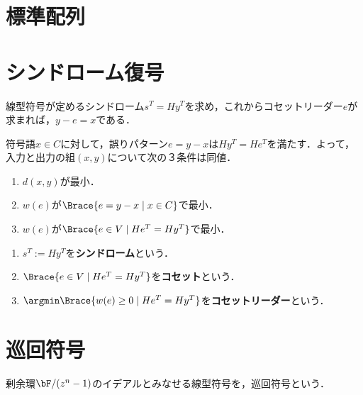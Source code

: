 \documentclass[uplatex,dvipdfmx]{jsreport}
\begin{document}
\section{標準配列}

\section{シンドローム復号}

\begin{tcolorbox}[colframe=ForestGreen, colback=ForestGreen!10!white,breakable,colbacktitle=ForestGreen!40!white,coltitle=black,fonttitle=\bfseries\sffamily,
title=]
    線型符号が定めるシンドローム$s^T=Hy^T$を求め，これからコセットリーダー$e$が求まれば，$y-e=x$である．
\end{tcolorbox}

\begin{discussion}[線型符号の最尤復号]
    符号語$x\in C$に対して，誤りパターン$e=y-x$は$Hy^T=He^T$を満たす．よって，入力と出力の組$(x,y)$について次の３条件は同値．
    \begin{enumerate}
        \item $d(x,y)$が最小．
        \item $w(e)$が$\Brace{e=y-x\mid x\in C}$で最小．
        \item $w(e)$が$\Brace{e\in V\mid He^T=Hy^T}$で最小．
    \end{enumerate}
\end{discussion}

\begin{definition}\mbox{}
    \begin{enumerate}
        \item $s^T:=Hy^T$を\textbf{シンドローム}という．
        \item $\Brace{e\in V\mid He^T=Hy^T}$を\textbf{コセット}という．
        \item $\argmin\Brace{w(e)\ge 0\mid He^T=Hy^T}$を\textbf{コセットリーダー}という．
    \end{enumerate}
\end{definition}

\section{巡回符号}

\begin{tcolorbox}[colframe=ForestGreen, colback=ForestGreen!10!white,breakable,colbacktitle=ForestGreen!40!white,coltitle=black,fonttitle=\bfseries\sffamily,
title=]
    剰余環$\bF/(z^n-1)$のイデアルとみなせる線型符号を，巡回符号という．
\end{tcolorbox}
\end{document}
